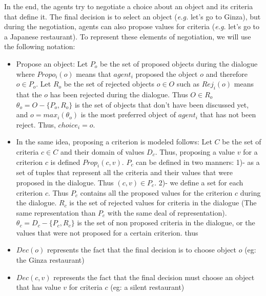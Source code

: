 \documentclass{llncs}
\begin{document}
 In the end, the agents try to negotiate a choice about an object and its criteria that define it. The final decision is to select an object (\emph{e.g.} let's go to Ginza), but during the negotiation, agents can also propose values for criteria (\emph{e.g.} let's go to a Japanese restaurant). To represent these elements of negotiation, we will use the following notation:
 \begin{itemize}
	 \item Propose an object: 
	 	\subitem Let $P_o$ be the set of proposed objects during the dialogue where $Propo_i(o)$ means that $agent_i$ proposed the object $o$ and therefore $o\in P_o$.
	 	\subitem Let  $R_o$  be the set of rejected objects $o\in O$ such as $Rej_i(o)$ means that the $o$ has been rejected during the dialogue. Thus $O \in R_o$
	 	\subitem $\theta_{o} = O-\{ P_o, R_o\}$ is the set of objects that don't have been discussed yet, and $o=max_i(\theta_{o})$ is the most preferred object of $agent_i$ that has not been reject. Thus, $choice_i= o$.
	\item In the same idea, proposing a criterion is modeled follows:   
		\subitem Let $C$ be the set of criteria $c \in C$ and their domain of values $D_c$. Thus, proposing a value $v$ for a criterion $c$ is defined $Prop_i(c,v)$. 
		\subitem $P_c$ can be defined in two manners: 1)- as a set of tuples that represent all the criteria and their values that were proposed in the dialogue. Thus $(c,v) \in P_c$. 2)- we define a set for each criterion $c$. Thus $P_c$ contains all the proposed values for the criterion $c$ during the dialogue.
		\subitem $R_c$ is the set of rejected values for criteria in the dialogue (The same representation than $P_c$ with the same deal of representation).
		\subitem  $\theta_{c} = D_c - \{P_c, R_c\}$ is the set of non proposed criteria in the dialogue, or the values that were not proposed for a certain criterion. thus 
   
   \item $Dec(o)$ represents the fact that the final decision is to choose object $o$ (eg: the Ginza restaurant)
   \item $Dec(c,v)$ represents the fact that the final decision must choose an object that has value $v$ for criteria $c$ (eg: a silent restaurant)
 \end{itemize}


\end{document}
